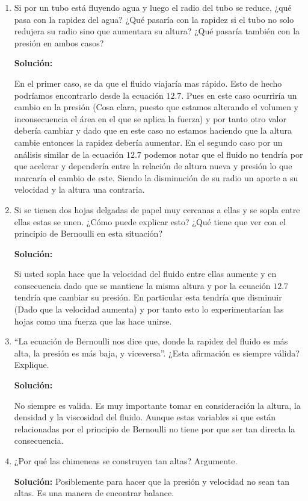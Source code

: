 \documentclass[a4paper, amsfonts, amssymb, amsmath, reprint, showkeys, nofootinbib, twoside]{revtex4-1}
\begin{document}
\begin{enumerate}
  \item Si por un tubo está fluyendo agua y luego el radio del
tubo se reduce, ¿qué pasa con la rapidez del agua?
¿Qué pasaría con la rapidez si el tubo no solo redujera
su radio sino que aumentara su altura? ¿Qué pasaría
también con la presión en ambos casos?

\textbf{Solución:}

En el primer caso, se da que el fluido viajaría mas rápido. Esto de hecho podríamos encontrarlo desde la ecuación $12.7$. Pues en este caso ocurriría un cambio en la presión (Cosa clara, puesto que estamos alterando el volumen y inconsecuencia el  área en el que se aplica la fuerza) y por tanto otro valor debería cambiar y dado que en este caso no estamos haciendo que la altura cambie entonces la rapidez debería aumentar. En el segundo caso  por un análisis similar de la ecuación  $12.7$ podemos notar que el fluido no tendría por que acelerar y dependería entre la relación de altura nueva y presión lo que marcaría el cambio de este. Siendo la disminución de su radio un aporte a su velocidad y la altura una contraria.

\item Si se tienen dos hojas delgadas de papel muy cercanas
a ellas y se sopla entre ellas estas se unen. ¿Cómo puede explicar esto? ¿Qué tiene que ver con el principio
de Bernoulli en esta situación?

\textbf{Solución:}

Si usted sopla hace que la velocidad del fluido entre ellas aumente y  en consecuencia dado que se mantiene la misma altura y por la ecuación $12.7$ tendría que cambiar su presión. En particular esta tendría que disminuir (Dado que la velocidad aumenta) y por tanto esto lo experimentarían las hojas como una fuerza que las hace unirse.


\item “La ecuación de Bernoulli nos dice que, donde la rapidez del fluido es más alta, la presión es más baja,
y viceversa”. ¿Esta afirmación es siempre válida? Explique.

\textbf{Solución:}

No siempre es valida. Es muy importante tomar en consideración la altura, la densidad y la viscosidad del fluido. Aunque estas variables si que están relacionadas por el principio de Bernoulli no tiene por que ser tan directa la consecuencia.

\item  ¿Por qué las chimeneas se construyen tan altas? Argumente.

  \textbf{Solución:}
  Posiblemente para hacer que la presión y velocidad no sean tan altas. Es una manera de encontrar balance.
\end{enumerate}
\end{document}
